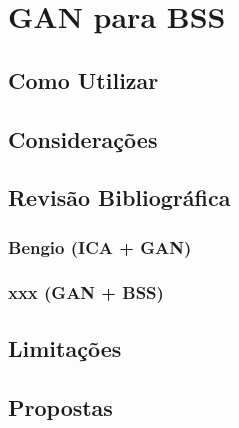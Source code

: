 \chapter{GAN para BSS}
\label{cha:gan_for_bss}

\section{Como Utilizar}
\label{sec:gan_for_bss_how_to_use}



\section{Considerações}
\label{sec:sec:gan_for_bss_considerations}



\section{Revisão Bibliográfica}
\label{sec:gan_for_bss_bib_review}




\subsection{Bengio (ICA + GAN)}
\label{subsec:gan_for_bss_ica_gan}



\subsection{xxx (GAN + BSS)}
\label{subsec:gan_for_bss_gan_bss}



\section{Limitações}
\label{sec:gan_for_bss_limitacoes}



\section{Propostas}
\label{sec:gan_for_bss_propositions}

